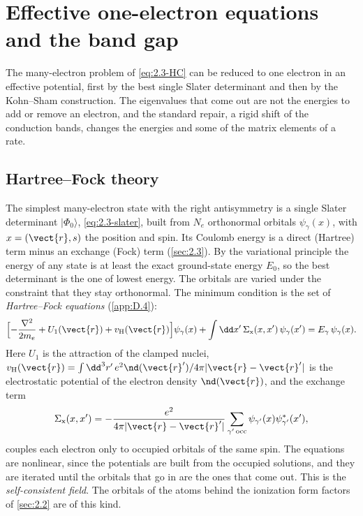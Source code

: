 \section{Effective one-electron equations and the band gap}\label{sec:3.4}

The many-electron problem of \cref{eq:2.3-HC} can be reduced to one electron in an effective potential, first by the best single Slater determinant and then by the Kohn--Sham construction. The eigenvalues that come out are not the energies to add or remove an electron, and the standard repair, a rigid shift of the conduction bands, changes the energies and some of the matrix elements of a rate.

\subsection{Hartree--Fock theory}

The simplest many-electron state with the right antisymmetry is a single Slater determinant $|\Phi_0\rangle$, \cref{eq:2.3-slater}, built from $N_e$ orthonormal orbitals $\psi_\gamma(x)$, with $x = (\vect{r}, s)$ the position and spin. Its Coulomb energy is a direct (Hartree) term minus an exchange (Fock) term (\cref{sec:2.3}). By the variational principle the energy of any state is at least the exact ground-state energy $E_0$, so the best determinant is the one of lowest energy. The orbitals are varied under the constraint that they stay orthonormal. The minimum condition is the set of \emph{Hartree--Fock equations} (\cref{app:D.4}):
\begin{equation}
  \Bigl[-\frac{\nabla^2}{2m_e} + U_1(\vect{r}) + v_{\mathrm{H}}(\vect{r})\Bigr]\psi_\gamma(x) + \int\dd x'\,\Sigma_{\mathrm{x}}(x, x')\,\psi_\gamma(x') = E_\gamma\,\psi_\gamma(x) .
  \label{eq:3.4-HF}
\end{equation}
Here $U_1$ is the attraction of the clamped nuclei, $v_{\mathrm{H}}(\vect{r}) = \int\dd^3r'\,e^2\nd(\vect{r}')/4\pi|\vect{r} - \vect{r}'|$ is the electrostatic potential of the electron density $\nd(\vect{r})$, and the exchange term
\begin{equation*}
  \Sigma_{\mathrm{x}}(x, x') = -\frac{e^2}{4\pi|\vect{r} - \vect{r}'|}\sum_{\gamma'\,\mathrm{occ}}\psi_{\gamma'}(x)\psi^*_{\gamma'}(x') ,
\end{equation*}
couples each electron only to occupied orbitals of the same spin. The equations are nonlinear, since the potentials are built from the occupied solutions, and they are iterated until the orbitals that go in are the ones that come out. This is the \emph{self-consistent field}. The orbitals of the atoms behind the ionization form factors of \cref{sec:2.2} are of this kind.


